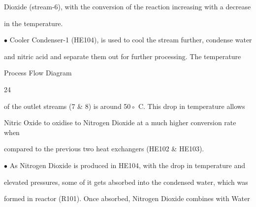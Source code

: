 \documentclass[a4paper,portrait,12pt]{article}
\begin{document}
\begin{flushleft}
Dioxide (stream-6), with the conversion of the reaction increasing with a decrease
\end{flushleft}


\begin{flushleft}
in the temperature.
\end{flushleft}


\begin{flushleft}
$\bullet$ Cooler Condenser-1 (HE104), is used to cool the stream further, condense water
\end{flushleft}


\begin{flushleft}
and nitric acid and separate them out for further processing. The temperature
\end{flushleft}





\begin{flushleft}
\newpage
Process Flow Diagram
\end{flushleft}





24





\begin{flushleft}
of the outlet streams (7 \& 8) is around 50◦ C. This drop in temperature allows
\end{flushleft}


\begin{flushleft}
Nitric Oxide to oxidise to Nitrogen Dioxide at a much higher conversion rate when
\end{flushleft}


\begin{flushleft}
compared to the previous two heat exchangers (HE102 \& HE103).
\end{flushleft}


\begin{flushleft}
$\bullet$ As Nitrogen Dioxide is produced in HE104, with the drop in temperature and
\end{flushleft}


\begin{flushleft}
elevated pressures, some of it gets absorbed into the condensed water, which was
\end{flushleft}


\begin{flushleft}
formed in reactor (R101). Once absorbed, Nitrogen Dioxide combines with Water
\end{flushleft}
\end{document}
